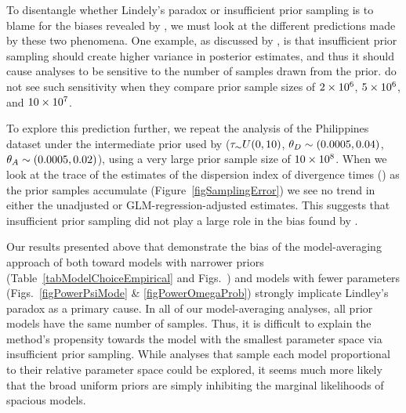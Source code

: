 \documentclass[letterpaper,12pt]{article}
\begin{document}
\begin{linenumbers}
To disentangle whether Lindely's paradox or insufficient prior sampling is
to blame for the biases revealed by \citet{Oaks2012}, we must look at
the different predictions made by these two phenomena.
One example, as discussed by \citet{Oaks2012}, is that insufficient prior
sampling should create higher variance in posterior estimates, and thus it
should cause analyses to be sensitive to the number of samples drawn from the
prior.
\citet{Oaks2012} do not see such sensitivity when they compare prior sample
sizes of $2\times 10^{6}$, $5\times 10^{6}$, and $10\times 10^{7}$.

To explore this prediction further, we repeat the analysis of the Philippines
dataset under the intermediate prior used by \citet{Oaks2012} ($\tau_{\sim} U(0,
10)$, $\meanDescendantTheta{} \sim (0.0005, 0.04)$, $\ancestralTheta{} \sim
(0.0005, 0.02)$), using a very large prior sample size of $10\times 10^{8}$.
When we look at the trace of the estimates of the dispersion index of
divergence times (\vmratio{}) as the prior samples accumulate
(Figure~\ref{figSamplingError}) we see no trend in either the unadjusted or
GLM-regression-adjusted estimates.
This suggests that insufficient prior sampling did not play a large
role in the bias found by \citet{Oaks2012}.

Our results presented above that demonstrate the bias of the model-averaging
approach of \citet{Hickerson2013} both toward models with narrower \divt{}
priors (Table~\ref{tabModelChoiceEmpirical} and
Figs.~)
and models with fewer \divt{} parameters (Figs.~\ref{figPowerPsiMode} \&
\ref{figPowerOmegaProb}) strongly implicate Lindley's paradox as a primary
cause.
In all of our model-averaging analyses, all prior models have the same number
of samples.
Thus, it is difficult to explain the method's propensity towards the model with
the smallest parameter space via insufficient prior sampling.
While analyses that sample each model proportional to their relative parameter
space could be explored, it seems much more likely that the broad uniform
priors are simply inhibiting the marginal likelihoods of spacious models.


\end{linenumbers}
\end{document}
